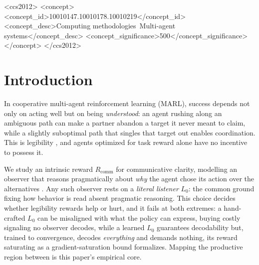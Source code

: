 \documentclass[sigconf,review,anonymous]{acmart}
\newcommand{\Rcomm}{R_{\text{comm}}}
\begin{document}
\begin{CCSXML}
<ccs2012>
<concept>
<concept_id>10010147.10010178.10010219</concept_id>
<concept_desc>Computing methodologies~Multi-agent systems</concept_desc>
<concept_significance>500</concept_significance>
</concept>
</ccs2012>
\end{CCSXML}

\maketitle

\section{Introduction}
\label{sec:intro}

In cooperative multi-agent reinforcement learning (MARL), success depends not only on acting well but on being \emph{understood}: an agent rushing along an ambiguous path can make a partner abandon a target it never meant to claim, while a slightly suboptimal path that singles that target out enables coordination. This is legibility \cite{dragan2013legibility}, and agents optimized for task reward alone have no incentive to possess it.

We study an intrinsic reward $\Rcomm$ for communicative clarity, modelling an observer that reasons pragmatically about \emph{why} the agent chose its action over the alternatives \cite{goodman2016pragmatic}. Any such observer rests on a \emph{literal listener} $L_0$: the common ground fixing how behavior is read absent pragmatic reasoning. This choice decides whether legibility rewards help or hurt, and it fails at both extremes: a hand-crafted $L_0$ can be misaligned with what the policy can express, buying costly signaling no observer decodes, while a learned $L_0$ guarantees decodability but, trained to convergence, decodes \emph{everything} and demands nothing, its reward saturating as a gradient-saturation bound formalizes. Mapping the productive region between is this paper's empirical core.
\end{document}
